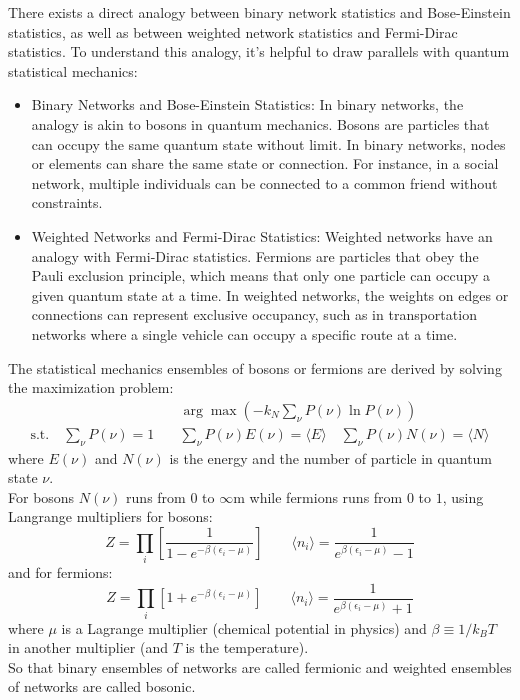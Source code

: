 There exists a direct analogy between binary network statistics and Bose-Einstein statistics, as well as between weighted network statistics and Fermi-Dirac statistics. To understand this analogy, it's helpful to draw parallels with quantum statistical mechanics:
\begin{itemize} 
\item Binary Networks and Bose-Einstein Statistics: In binary networks, the analogy is akin to bosons in quantum mechanics. Bosons are particles that can occupy the same quantum state without limit. In binary networks, nodes or elements can share the same state or connection. For instance, in a social network, multiple individuals can be connected to a common friend without constraints.

\item Weighted Networks and Fermi-Dirac Statistics: Weighted networks have an analogy with Fermi-Dirac statistics. Fermions are particles that obey the Pauli exclusion principle, which means that only one particle can occupy a given quantum state at a time. In weighted networks, the weights on edges or connections can represent exclusive occupancy, such as in transportation networks where a single vehicle can occupy a specific route at a time.
\end{itemize}
The statistical mechanics ensembles of bosons or fermions are derived by solving the maximization problem:
\begin{align*}
	&\arg\max \left(-k_N \sum_\nu P(\nu) \ln P(\nu)\right)\\
	\text{s.t.} \quad \sum_\nu P(\nu) =1 \quad &\sum_\nu P(\nu)E(\nu) = \langle E \rangle \quad \sum_\nu P(\nu)N(\nu) = \langle N \rangle
\end{align*}
where $E(\nu)$ and $N(\nu)$ is the energy and the number of particle in quantum state $\nu$.\\
For bosons $N(\nu)$ runs from $0$ to $\infty$m while fermions runs from $0$ to $1$, using Langrange multipliers for bosons:
\[
Z = \prod_{i} \left[\frac{1}{1 - e^{-\beta(\epsilon_i - \mu)}}\right] \qquad \langle n_i \rangle =\frac{1}{e^{\beta(\epsilon_i - \mu)}-1}
\]
and for fermions:
\[
Z = \prod_i [1 + e^{-\beta (\epsilon_i - \mu)}] \qquad \langle n_i \rangle = \frac{1}{e^{\beta (\epsilon_i - \mu)}+1}
\]
where $\mu$ is a Lagrange multiplier (chemical potential in physics) and $\beta \equiv 1/k_BT$ in another multiplier (and $T$ is the temperature). \\ 
So that binary ensembles of networks are called fermionic and weighted ensembles of networks are called bosonic.
